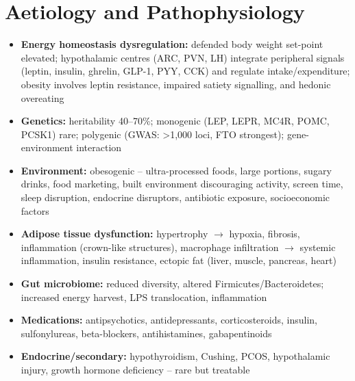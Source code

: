 \section*{Aetiology and Pathophysiology}
\begin{itemize}
    \item \textbf{Energy homeostasis dysregulation:} defended body weight set-point elevated; hypothalamic centres (ARC, PVN, LH) integrate peripheral signals (leptin, insulin, ghrelin, GLP-1, PYY, CCK) and regulate intake/expenditure; obesity involves leptin resistance, impaired satiety signalling, and hedonic overeating
    \item \textbf{Genetics:} heritability 40--70\%; monogenic (LEP, LEPR, MC4R, POMC, PCSK1) rare; polygenic (GWAS: >1,000 loci, FTO strongest); gene-environment interaction
    \item \textbf{Environment:} obesogenic -- ultra-processed foods, large portions, sugary drinks, food marketing, built environment discouraging activity, screen time, sleep disruption, endocrine disruptors, antibiotic exposure, socioeconomic factors
    \item \textbf{Adipose tissue dysfunction:} hypertrophy $\to$ hypoxia, fibrosis, inflammation (crown-like structures), macrophage infiltration $\to$ systemic inflammation, insulin resistance, ectopic fat (liver, muscle, pancreas, heart)
    \item \textbf{Gut microbiome:} reduced diversity, altered Firmicutes/Bacteroidetes; increased energy harvest, LPS translocation, inflammation
    \item \textbf{Medications:} antipsychotics, antidepressants, corticosteroids, insulin, sulfonylureas, beta-blockers, antihistamines, gabapentinoids
    \item \textbf{Endocrine/secondary:} hypothyroidism, Cushing, PCOS, hypothalamic injury, growth hormone deficiency -- rare but treatable
\end{itemize}

